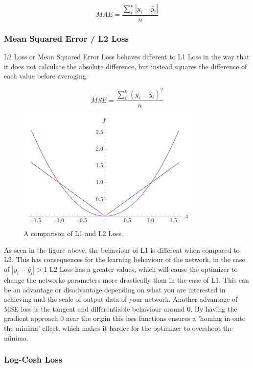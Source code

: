 \documentclass[a4paper,10pt]{scrartcl}
\begin{document}
\begin{equation}
    MAE = \frac{\sum_i^n |y_i - \hat{y}_i|}{n}
\end{equation}

\subsubsection*{Mean Squared Error / L2 Loss}

L2 Loss or Mean Squared Error Loss behaves different to L1 Loss in the way that it does not calculate the absolute difference, but instead squares the difference of each value before averaging.

\begin{equation}
    MSE = \frac{\sum_i^n (y_i - \hat{y}_i)^2}{n}
\end{equation}

\begin{figure}[h]
    \includegraphics[scale=0.5]{images/l1l2loss.png}
    \centering
    \caption{A comparison of L1 and L2 Loss.}
\end{figure}

As seen in the figure above, the behaviour of L1 is different when compared to L2.
This has consequences for the learning behaviour of the network, in the case of $|y_i - \hat{y}_i| > 1$ L2 Loss has a greater values, which will cause the optimizer to change the networks parameters more drastically than in the case of L1.
This can be an advantage or disadvantage depending on what you are interested in achieving and the scale of output data of your network.
Another advantage of MSE loss is the tangent and differentiable behaviour around 0.
By having the gradient approach 0 near the origin this loss functions ensures a 'homing in onto the minima' effect, which makes it harder for the optimizer to overshoot the minima.

\subsubsection*{Log-Cosh Loss}
\end{document}
